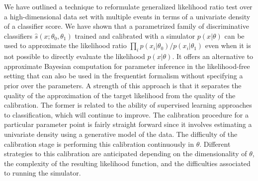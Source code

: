 \documentclass[12pt]{article}
\numberwithin{equation}{section}
\theoremstyle{plain}
\begin{document}
We have outlined a technique to reformulate generalized likelihood ratio test over a high-dimensional data set with multiple events in terms of a univariate density of a classifier score.
We have shown that a parametrized family of discriminative classifiers $\hat s(x; \theta_0, \theta_1)$ trained and calibrated with a simulator  $p(x|\theta)$ can be used to approximate the  likelihood ratio  $\prod_i p(x_i|\theta_0)/p(x_i|\theta_1)$ even when it is not possible to directly evaluate the likelihood $p(x|\theta)$.
It offers an alternative to approximate Bayesian computation for parameter inference in the likelihood-free setting that can also be used in the frequentist formalism without specifying a prior over the parameters. A strength of this approach is that it separates the quality of the approximation of the target likelihood from the quality of the calibration. The former is related to the ability of supervised learning approaches to  classification, which will continue to improve. The calibration procedure for a particular parameter point is fairly straight forward since it involves estimating a univariate density using a generative model of the data. The difficulty of the calibration stage is performing this calibration continuously in $\theta$. Different strategies to this calibration are anticipated depending on the dimensionality of $\theta$, the complexity of the resulting likelihood function, and the difficulties associated to running the simulator.






\end{document}
